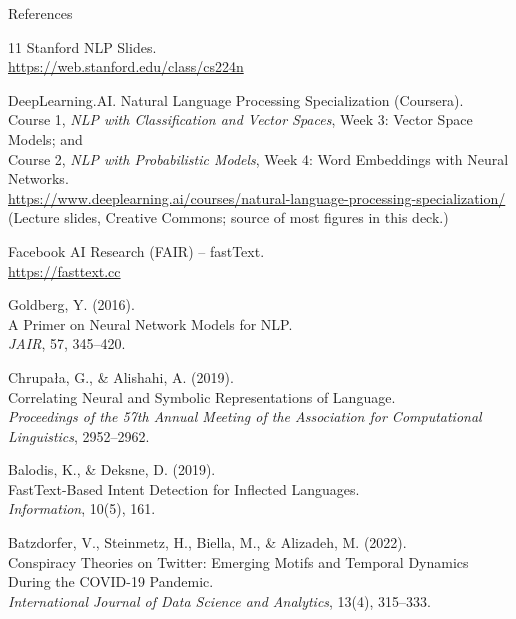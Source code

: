 \begin{frame}[allowframebreaks]{References}
\begin{thebibliography}{11}
        Stanford NLP Slides.\\
        \url{https://web.stanford.edu/class/cs224n}

        DeepLearning.AI. Natural Language Processing Specialization (Coursera).\\
        Course 1, \textit{NLP with Classification and Vector Spaces}, Week 3: Vector Space Models; and\\
        Course 2, \textit{NLP with Probabilistic Models}, Week 4: Word Embeddings with Neural Networks.\\
        \url{https://www.deeplearning.ai/courses/natural-language-processing-specialization/}\\
        (Lecture slides, Creative Commons; source of most figures in this deck.)

        Facebook AI Research (FAIR) – fastText.\\
        \url{https://fasttext.cc}

        Goldberg, Y. (2016).\\
        A Primer on Neural Network Models for NLP.\\
        \textit{JAIR}, 57, 345--420.

        Chrupała, G., \& Alishahi, A. (2019).\\
        Correlating Neural and Symbolic Representations of Language.\\
        \textit{Proceedings of the 57th Annual Meeting of the Association for Computational Linguistics}, 2952--2962.

        Balodis, K., \& Deksne, D. (2019).\\
        FastText-Based Intent Detection for Inflected Languages.\\
        \textit{Information}, 10(5), 161.

        Batzdorfer, V., Steinmetz, H., Biella, M., \& Alizadeh, M. (2022).\\
        Conspiracy Theories on Twitter: Emerging Motifs and Temporal Dynamics During the COVID-19 Pandemic.\\
        \textit{International Journal of Data Science and Analytics}, 13(4), 315--333.
    \end{thebibliography}
\end{frame}